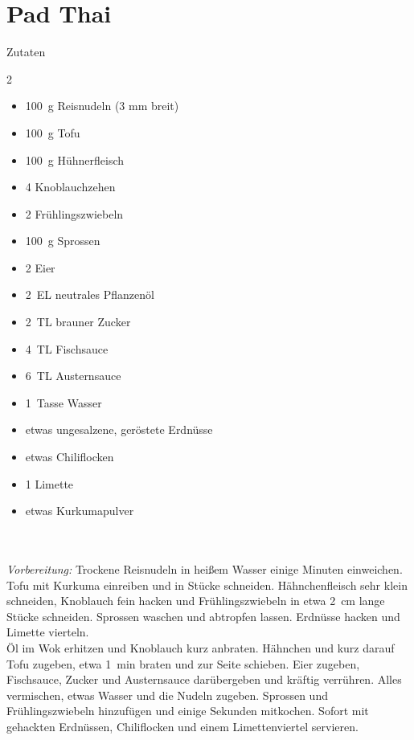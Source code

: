 \section*{Pad Thai}

\ihead{}\ohead{}
\cfoot{}

{\Large Zutaten}

\begin{multicols}{2}
\begin{itemize}
    \item \SI{100}{g} Reisnudeln (3 mm breit)
    \item \SI{100}{g} Tofu
    \item \SI{100}{g} Hühnerfleisch
    \item \num{4} Knoblauchzehen
    \item \num{2} Frühlingszwiebeln
    \item \SI{100}{g} Sprossen
    \item \num{2} Eier
    \item \SI{2}{EL} neutrales Pflanzenöl
    \item \SI{2}{TL} brauner Zucker
    \item \SI{4}{TL} Fischsauce
    \item \SI{6}{TL} Austernsauce
    \item \SI{1}{Tasse} Wasser
    \item etwas ungesalzene, geröstete Erdnüsse
    \item etwas Chiliflocken
    \item \num{1} Limette
    \item etwas Kurkumapulver
\end{itemize}
\end{multicols}

\\ \\

\textit{Vorbereitung:} Trockene Reisnudeln in heißem Wasser einige Minuten einweichen. 
Tofu mit Kurkuma einreiben und in Stücke schneiden. 
Hähnchenfleisch sehr klein schneiden, Knoblauch fein hacken und Frühlingszwiebeln in etwa \SI{2}{cm} lange Stücke schneiden. 
Sprossen waschen und abtropfen lassen. Erdnüsse hacken und Limette vierteln.\\

Öl im Wok erhitzen und Knoblauch kurz anbraten. 
Hähnchen und kurz darauf Tofu zugeben, etwa \SI{1}{min} braten und zur Seite schieben. 
Eier zugeben, Fischsauce, Zucker und Austernsauce darübergeben und kräftig verrühren. 
Alles vermischen, etwas Wasser und die Nudeln zugeben. 
Sprossen und Frühlingszwiebeln hinzufügen und einige Sekunden mitkochen. 
Sofort mit gehackten Erdnüssen, Chiliflocken und einem Limettenviertel servieren.

